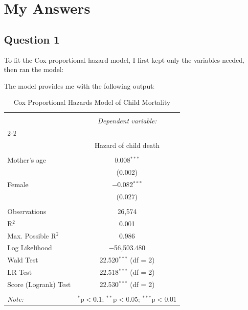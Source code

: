 \documentclass[12pt,letterpaper]{article}
\begin{document}
\section*{My Answers}
\subsection*{Question 1}


To fit the Cox proportional hazard model, I first kept only the variables needed, then ran the model: 


\noindent The model provides me with the following output: 
\begin{table}[!htbp] \centering 
	\caption{Cox Proportional Hazards Model of Child Mortality} 
	\label{} 
	\begin{tabular}{@{\extracolsep{5pt}}lc} 
		\\[-1.8ex]\hline 
		\hline \\[-1.8ex] 
		& \multicolumn{1}{c}{\textit{Dependent variable:}} \\ 
		\cline{2-2} 
		\\[-1.8ex] & Hazard of child death \\ 
		\hline \\[-1.8ex] 
		Mother's age & 0.008$^{***}$ \\ 
		& (0.002) \\ 
		Female & $-$0.082$^{***}$ \\ 
		& (0.027) \\ 
		\hline \\[-1.8ex] 
		Observations & 26,574 \\ 
		R$^{2}$ & 0.001 \\ 
		Max. Possible R$^{2}$ & 0.986 \\ 
		Log Likelihood & $-$56,503.480 \\ 
		Wald Test & 22.520$^{***}$ (df = 2) \\ 
		LR Test & 22.518$^{***}$ (df = 2) \\ 
		Score (Logrank) Test & 22.530$^{***}$ (df = 2) \\ 
		\hline 
		\hline \\[-1.8ex] 
		\textit{Note:}  & \multicolumn{1}{r}{$^{*}$p$<$0.1; $^{**}$p$<$0.05; $^{***}$p$<$0.01} \\ 
	\end{tabular} 
\end{table} 
\end{document}
